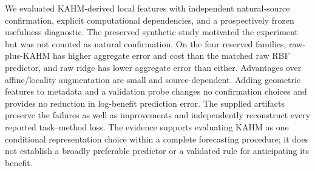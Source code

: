 We evaluated KAHM-derived local features with independent natural-source
confirmation, explicit computational dependencies, and a prospectively
frozen usefulness diagnostic. The preserved synthetic study motivated
the experiment but was not counted as natural confirmation. On the four
reserved families, raw-plus-KAHM has higher aggregate error and cost
than the matched raw RBF predictor, and raw ridge has lower aggregate error than
either. Advantages over affine/locality augmentation are small and
source-dependent. Adding geometric features to metadata and a validation
probe changes no confirmation choices and provides no reduction in
log-benefit prediction error. The supplied artifacts preserve the
failures as well as improvements and independently reconstruct every
reported task--method loss. The evidence supports evaluating KAHM as
one conditional representation choice within a complete forecasting
procedure; it does not establish a broadly preferable predictor or a
validated rule for anticipating its benefit.
